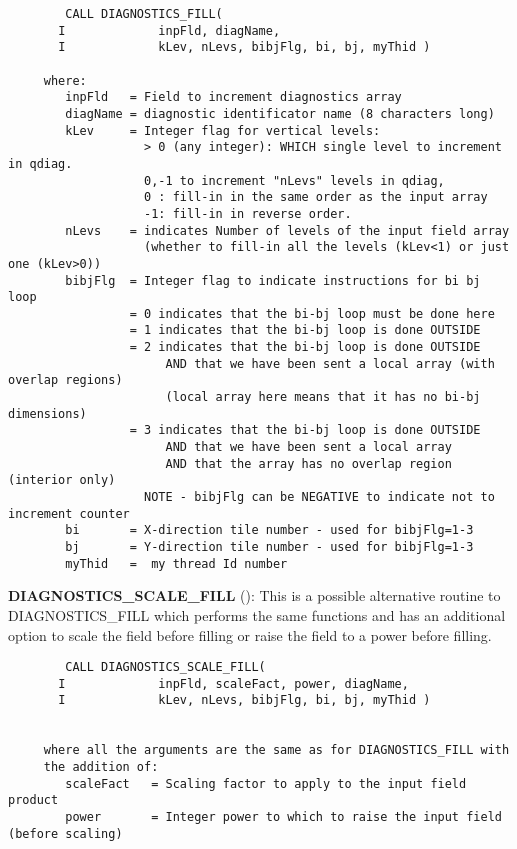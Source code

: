 \begin{verbatim}
        CALL DIAGNOSTICS_FILL(
       I             inpFld, diagName,
       I             kLev, nLevs, bibjFlg, bi, bj, myThid )

     where:
        inpFld   = Field to increment diagnostics array
        diagName = diagnostic identificator name (8 characters long)
        kLev     = Integer flag for vertical levels:
                   > 0 (any integer): WHICH single level to increment in qdiag.
                   0,-1 to increment "nLevs" levels in qdiag,
                   0 : fill-in in the same order as the input array
                   -1: fill-in in reverse order.
        nLevs    = indicates Number of levels of the input field array
                   (whether to fill-in all the levels (kLev<1) or just one (kLev>0))
        bibjFlg  = Integer flag to indicate instructions for bi bj loop
                 = 0 indicates that the bi-bj loop must be done here
                 = 1 indicates that the bi-bj loop is done OUTSIDE
                 = 2 indicates that the bi-bj loop is done OUTSIDE
                      AND that we have been sent a local array (with overlap regions)
                      (local array here means that it has no bi-bj dimensions)
                 = 3 indicates that the bi-bj loop is done OUTSIDE
                      AND that we have been sent a local array
                      AND that the array has no overlap region (interior only)
                   NOTE - bibjFlg can be NEGATIVE to indicate not to increment counter
        bi       = X-direction tile number - used for bibjFlg=1-3
        bj       = Y-direction tile number - used for bibjFlg=1-3
        myThid   =  my thread Id number
\end{verbatim}

\noindent
{\bf DIAGNOSTICS\_SCALE\_FILL}
():
This is a possible alternative routine to
DIAGNOSTICS\_FILL which performs the same functions and has an additional option
to scale the field before filling or raise the field to a power before filling.

\begin{verbatim}
        CALL DIAGNOSTICS_SCALE_FILL(
       I             inpFld, scaleFact, power, diagName,
       I             kLev, nLevs, bibjFlg, bi, bj, myThid )


     where all the arguments are the same as for DIAGNOSTICS_FILL with
     the addition of:
        scaleFact   = Scaling factor to apply to the input field product
        power       = Integer power to which to raise the input field (before scaling)
\end{verbatim}

